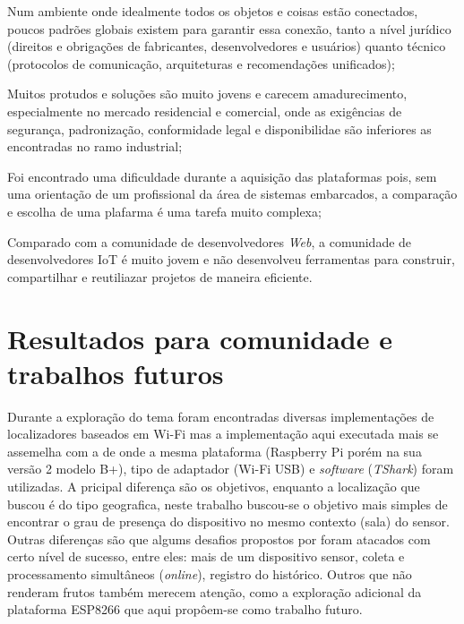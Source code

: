 \begin{alineas}
	\item Num ambiente onde
	idealmente todos os objetos e coisas estão conectados, poucos padrões globais
	existem para garantir essa conexão, tanto a nível jurídico (direitos e
	obrigações de fabricantes, desenvolvedores e usuários) quanto técnico
	(protocolos de comunicação, arquiteturas e recomendações unificados);

	\item Muitos protudos e soluções são muito jovens e carecem amadurecimento,
	especialmente no mercado residencial e comercial, onde as exigências de
	segurança, padronização, conformidade legal e disponibilidae são inferiores
	as encontradas no ramo industrial;

	\item Foi encontrado uma dificuldade durante a aquisição das plataformas pois,
	sem uma orientação de um profissional da área de sistemas embarcados, a
	comparação e escolha de uma plafarma é uma tarefa muito complexa;

	\item Comparado com a comunidade de desenvolvedores \emph{Web}, a comunidade
	de desenvolvedores IoT é muito jovem e não desenvolveu ferramentas para
	construir, compartilhar e reutiliazar projetos de maneira eficiente.
\end{alineas}


\section{Resultados para comunidade e trabalhos futuros}
\label{sec:trab-futuros}

Durante a exploração do tema foram encontradas diversas implementações de
localizadores baseados em Wi-Fi mas a implementação aqui executada mais se
assemelha com a de  onde a mesma plataforma
(Raspberry Pi porém na sua versão 2 modelo B+), tipo de adaptador (Wi-Fi USB)
e \emph{software} (\emph{TShark}) foram utilizadas. A pricipal diferença são os
objetivos, enquanto a localização que  buscou é do tipo
geografica, neste trabalho buscou-se o objetivo mais simples de encontrar o grau
de presença do dispositivo no mesmo contexto (sala) do sensor. Outras diferenças
são que algums desafios propostos por  foram atacados
com certo nível de sucesso, entre eles: mais de um dispositivo sensor,
coleta e processamento simultâneos (\emph{online}), registro do histórico.
Outros que não renderam frutos também merecem atenção, como a exploração
adicional da plataforma ESP8266 que aqui propôem-se como trabalho futuro.
